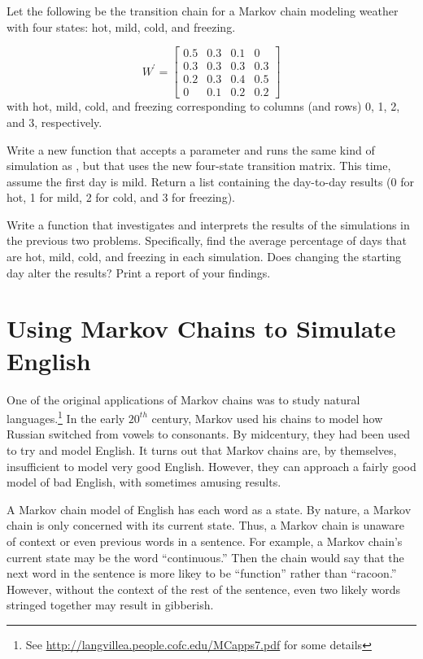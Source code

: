 \begin{problem} %
Let the following be the transition chain for a Markov chain modeling weather with four states: hot, mild, cold, and freezing.

\[ W^\prime = \left[\begin{array}{cccc}
0.5 & 0.3 & 0.1 & 0\\
0.3 & 0.3 & 0.3 & 0.3\\
0.2 & 0.3 & 0.4 & 0.5\\
  0 & 0.1 & 0.2 & 0.2\end{array} \right]\]
with hot, mild, cold, and freezing corresponding to columns (and rows) 0, 1, 2, and 3, respectively.

Write a new function that accepts a parameter  and runs the same kind of simulation as , but that uses the new four-state transition matrix.
This time, assume the first day is mild.
Return a list containing the day-to-day results (0 for hot, 1 for mild, 2 for cold, and 3 for freezing).
\label{problem:transition}
\end{problem}

\begin{problem} %
Write a function that investigates and interprets the results of the simulations in the previous two problems.
Specifically, find the average percentage of days that are hot, mild, cold, and freezing in each simulation.
Does changing the starting day alter the results?
Print a report of your findings.
\end{problem}

\section*{Using Markov Chains to Simulate English} %
One of the original applications of Markov chains was to study natural languages.\footnote{See \url{http://langvillea.people.cofc.edu/MCapps7.pdf} for some details}
In the early $20^{th}$ century, Markov used his chains to model how Russian switched from vowels to consonants.
By midcentury, they had been used to try and model English.
It turns out that Markov chains are, by themselves, insufficient to model very good English.
However, they can approach a fairly good model of bad English, with sometimes amusing results.

A Markov chain model of English has each word as a state.
By nature, a Markov chain is only concerned with its current state.
Thus, a Markov chain is unaware of context or even previous words in a sentence.
For example, a Markov chain's current state may be the word ``continuous.''
Then the chain would say that the next word in the sentence is more likey to be ``function'' rather than ``racoon.''
However, without the context of the rest of the sentence, even two likely words stringed together may result in gibberish.

